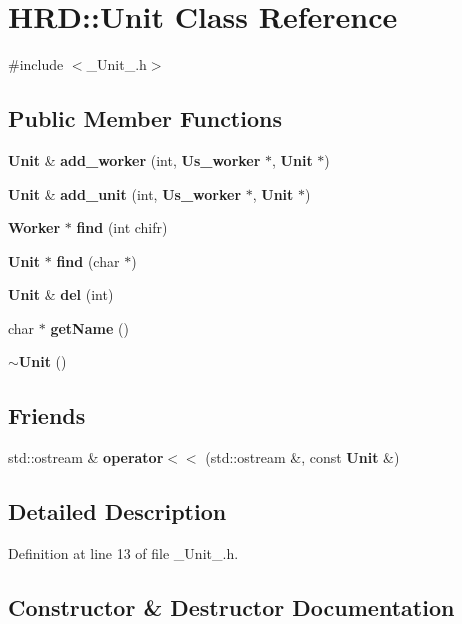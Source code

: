 \section{H\+RD\+:\+:Unit Class Reference}
\label{class_h_r_d_1_1_unit}


{\ttfamily \#include $<$\+\_\+\+Unit\+\_\+.\+h$>$}

\subsection*{Public Member Functions}
\begin{DoxyCompactItemize}
\item 
\textbf{ Unit} \& \textbf{ add\+\_\+worker} (int, \textbf{ Us\+\_\+worker} $\ast$, \textbf{ Unit} $\ast$)
\item 
\textbf{ Unit} \& \textbf{ add\+\_\+unit} (int, \textbf{ Us\+\_\+worker} $\ast$, \textbf{ Unit} $\ast$)
\item 
\textbf{ Worker} $\ast$ \textbf{ find} (int chifr)
\item 
\textbf{ Unit} $\ast$ \textbf{ find} (char $\ast$)
\item 
\textbf{ Unit} \& \textbf{ del} (int)
\item 
char $\ast$ \textbf{ get\+Name} ()
\item 
\textbf{ $\sim$\+Unit} ()
\end{DoxyCompactItemize}
\subsection*{Friends}
\begin{DoxyCompactItemize}
\item 
std\+::ostream \& \textbf{ operator$<$$<$} (std\+::ostream \&, const \textbf{ Unit} \&)
\end{DoxyCompactItemize}


\subsection{Detailed Description}


Definition at line 13 of file \+\_\+\+Unit\+\_\+.\+h.



\subsection{Constructor \& Destructor Documentation}
\mbox{\label{class_h_r_d_1_1_unit_a83e071cb3bd439e18fa210d9fa063354}} 

